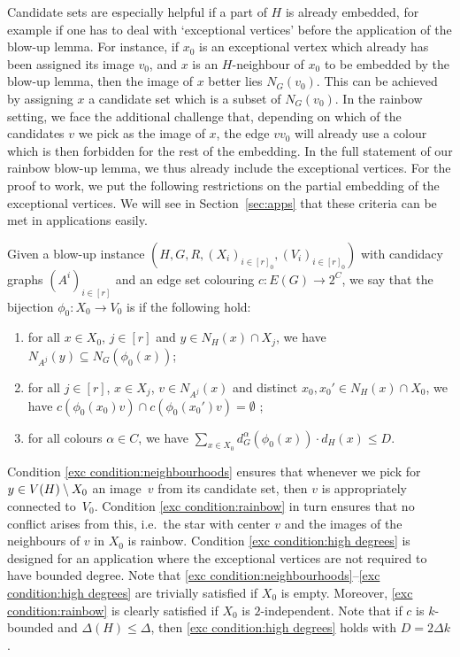 \documentclass[10pt]{amsart}
\theoremstyle{definition}
\theoremstyle{claimstyle}
\theoremstyle{stepstyle}
\numberwithin{equation}{section}
\begin{document}
Candidate sets are especially helpful if a part of $H$ is already embedded, for example if one has to deal with `exceptional vertices' before the application of the blow-up lemma. For instance, if $x_0$ is an exceptional vertex which already has been assigned its image $v_0$, and $x$ is an $H$-neighbour of $x_0$ to be embedded by the blow-up lemma, then the image of $x$ better lies $N_G(v_0)$. This can be achieved by assigning $x$ a candidate set which is a subset of $N_G(v_0)$. In the rainbow setting, we face the additional challenge that, depending on which of the candidates $v$ we pick as the image of $x$, the edge $vv_0$ will already use a colour which is then forbidden for the rest of the embedding.
In the full statement of our rainbow blow-up lemma, we thus already include the exceptional vertices. For the proof to work, we put the following restrictions on the partial embedding of the exceptional vertices. We will see in Section~\ref{sec:apps} that these criteria can be met in applications easily.

Given a blow-up instance $(H,G,R,(X_i)_{i\in[r]_0},(V_i)_{i\in[r]_0})$ with candidacy graphs $(A^i)_{i\in[r]}$ and an edge set colouring $c\colon E(G)\to 2^C$, we say that the bijection $\phi_0\colon X_0\to V_0$ is  if the following hold:
\begin{enumerate}[label=\rm{(EXC\arabic*)}]
\item for all $x\in X_0$, $j\in[r]$ and $y\in N_H(x)\cap X_j$,
we have $N_{A^j}(y)\subseteq N_G(\phi_0(x))$; \label{exc condition:neighbourhoods}
\item for all $j\in [r]$, $x\in X_j$, $v\in N_{A^j}(x)$ and distinct $x_0,x_0'\in N_H(x)\cap X_0$, we have $c(\phi_0(x_0)v)\cap c(\phi_0(x_0')v)=\emptyset$ ; \label{exc condition:rainbow}
\item for all colours $\alpha \in C$, we have $\sum_{x\in X_0} d^{\alpha}_G (\phi_0(x))\cdot d_H(x) \le D$. \label{exc condition:high degrees}
\end{enumerate}

Condition \ref{exc condition:neighbourhoods} ensures that whenever we pick for $y\in V(H)\setminus X_0$ an image~$v$ from its candidate set, then $v$ is appropriately connected to~$V_0$. Condition \ref{exc condition:rainbow} in turn ensures that no conflict arises from this, i.e.~the star with center $v$ and the images of the neighbours of $v$ in $X_0$ is rainbow.
Condition \ref{exc condition:high degrees} is designed for an application where the exceptional vertices are not required to have bounded degree.
Note that \ref{exc condition:neighbourhoods}--\ref{exc condition:high degrees} are trivially satisfied if $X_0$ is empty. Moreover, \ref{exc condition:rainbow} is clearly satisfied if $X_0$ is $2$-independent. Note that if $c$ is $k$-bounded and $\Delta(H)\le \Delta$, then \ref{exc condition:high degrees} holds with $D=2\Delta k$.
\end{document}
